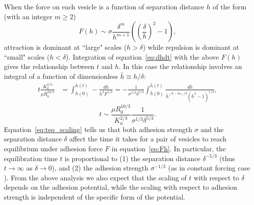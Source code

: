 \documentclass[%
preprint,
 amsmath,amssymb,
 aps,
]{revtex4-1}
\begin{document}
When the force on each vesicle is a function of separation distance $h$ of the form (with an integer $m\ge 2$)
\begin{equation}
\label{eq:Fh}
F(h) \sim \sigma \frac{\delta^m}{h^{m+1}}\left(\left(\frac{\delta}{h}\right)^2-1\right),
\end{equation}
attraction is dominant at ``large" scales ($h > \delta$) while repulsion is dominant at ``small" scales ($h<\delta$).
Integration of equation~\ref{eq:dhdt} with the above $F(h)$ gives the relationship between $t$ and $h$.
In this case the relationship involves an integral of a function of dimensionless $\bar{h} \equiv h/\delta$:
\begin{align}
t\frac{K_a^{2/3}}{\mu R_0^{10/3}}& = \int^{h(t)}_{h(0)}-\frac{dh}{h^3 F^{1/3}} = -\frac{1}{\sigma^{1/3}\delta^{5/3}}\int^{\bar{h}(t)}_{\bar{h}(0)}\frac{d \bar{h}}{\bar{h}^{(8-m)/3}(\bar{h}^2-1)^{1/3}},
\end{align}
\begin{equation}
\label{eq:teq_scaling}
t\sim \frac{\mu R_0^{10/3}}{K_a^{2/3}}\frac{1}{\sigma^{1/3}\delta^{5/3}}.
\end{equation}
Equation~\ref{eq:teq_scaling} tells us that both adhesion strength $\sigma$ and the separation distance $\delta$ affect
the time it takes for a pair of vesicles to reach equilibrium under adhesion force $F$ in equation~\ref{eq:Fh}.  In particular, the equilibration time $t$ 
is proportional to (1) the separation distance $\delta^{-5/3}$ (thus $t\rightarrow \infty$ as $\delta\rightarrow 0$), and (2) the adhesion strength $\sigma^{-1/3}$ 
(as in constant forcing case \cite{RamachandranLeal2010_PoF}).  From the above analysis we also expect that the scaling of $t$ with respect to $\delta$ depends on the
adhesion potential, while the scaling with respect to adhesion strength is independent of the specific form of the potential.
\end{document}
